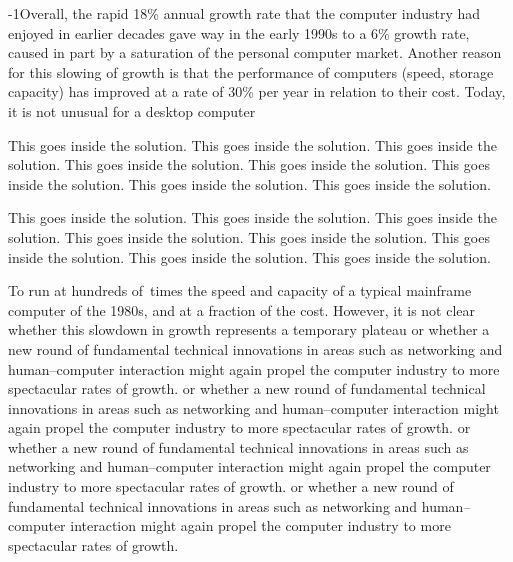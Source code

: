 \looseness-1Overall, the rapid 18\% annual growth rate that the computer
industry had enjoyed in earlier decades gave way in the early
1990s to a 6\% growth rate, caused in part by a saturation of the
personal computer market. Another reason for this slowing of
growth is that the performance of computers (speed, storage
capacity) has improved at a rate of 30\% per year in relation to
their cost. Today, it is not unusual for a desktop computer 
\begin{solution}
This goes inside the solution. This goes inside the solution. This goes inside the solution. 
This goes inside the solution. This goes inside the solution. 
This goes inside the solution. This goes inside the solution. This goes inside the solution. 
\end{solution}
\begin{solution}
This goes inside the solution. This goes inside the solution. This goes inside the solution. 
This goes inside the solution. This goes inside the solution. 
This goes inside the solution. This goes inside the solution. This goes inside the solution. 
\end{solution}
To run at hundreds of\, times the speed and capacity of a typical 
mainframe computer of the 1980s, and at a fraction of the cost. However, 
it is not clear whether this slowdown in growth represents a temporary plateau 
or whether a new round of fundamental technical innovations in areas
such as networking and human--computer interaction might again
propel the computer industry to more spectacular rates of growth.
or whether a new round of fundamental technical innovations in areas
such as networking and human--computer interaction might again
propel the computer industry to more spectacular rates of growth.
or whether a new round of fundamental technical innovations in areas
such as networking and human--computer interaction might again
propel the computer industry to more spectacular rates of growth.
or whether a new round of fundamental technical innovations in areas
such as networking and human--computer interaction might again
propel the computer industry to more spectacular rates of growth.



